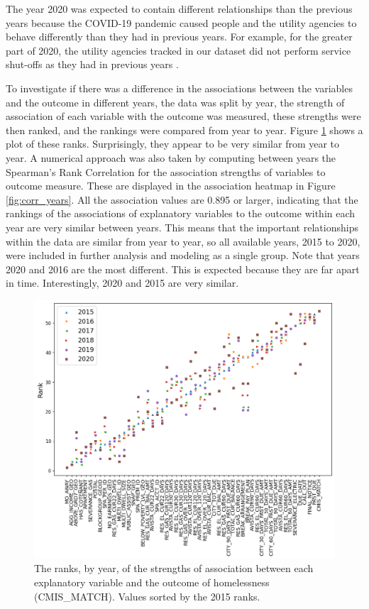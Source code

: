 \documentclass[utf8]{frontiersFPHY} %
\begin{document}
The year 2020 was expected to contain different relationships than the previous years because the COVID-19 pandemic caused people and the utility agencies to behave differently than they had in previous years. For example, for the greater part of 2020, the utility agencies tracked in our dataset did not perform service shut-offs as they had in previous years \cite{white2020utilities}. 

To investigate if there was a difference in the associations between the variables and the outcome in different years, the data was split by year, the strength of association of each variable with the outcome was measured, these strengths were then ranked, and the rankings were compared from year to year. Figure \ref{fig:corrRankByYear} shows a plot of these ranks. Surprisingly, they appear to be very similar from year to year. A numerical approach was also taken by computing between years the Spearman's Rank Correlation for the association strengths of variables to outcome measure. These are displayed in the association heatmap in Figure \ref{fig:corr_years}. All the association values are 0.895 or larger, indicating that the rankings of the associations of explanatory variables to the outcome within each year are very similar between years. This means that the important relationships within the data are similar from year to year, so all available years, 2015 to 2020, were included in further analysis and modeling as a single group. Note that years 2020 and 2016 are the most different. This is expected because they are far apart in time. Interestingly, 2020 and 2015 are very similar.

\begin{figure}[h]
    \centering
    \includegraphics[width=\textwidth]{../img/corrRankByYear.png}
    \caption[Ranks of variable correlation by year]{The ranks, by year, of the strengths of association between each explanatory variable and the outcome of homelessness (CMIS\_MATCH). Values sorted by the 2015 ranks.}
    \label{fig:corrRankByYear}
\end{figure}
\end{document}
